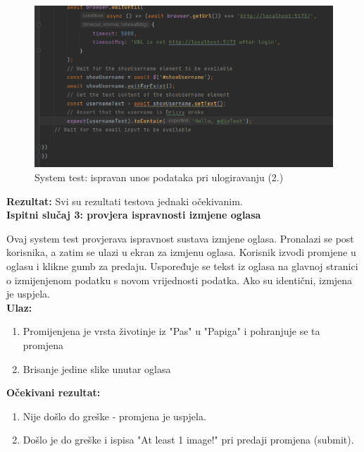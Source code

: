 			\begin{figure}[H]
				\includegraphics[scale=0.7]{slike/syslogin2.PNG} 
				\centering
				\caption{System test: ispravan unos podataka pri ulogiravanju (2.)}
				\label{syslogin2}
			\end{figure}
			
			\textbf{Rezultat:}
			Svi su rezultati testova jednaki očekivanim.\\
			
			\textbf{Ispitni slučaj 3: provjera ispravnosti izmjene oglasa}
			
			Ovaj system test provjerava ispravnost sustava izmjene oglasa. Pronalazi se post korisnika, a zatim se ulazi u ekran za izmjenu oglasa. Korisnik izvodi promjene u oglasu i klikne gumb za predaju. Uspoređuje se tekst iz oglasa na glavnoj stranici o izmijenjenom podatku s novom vrijednosti podatka. Ako su identični, izmjena je uspjela. \\
			
			\textbf{Ulaz:}
			
				\begin{enumerate}
					\item Promijenjena je vrsta životinje iz "Pas" u "Papiga" i pohranjuje se ta promjena
					\item Brisanje jedine slike unutar oglasa
				\end{enumerate}
				
			\textbf{Očekivani rezultat:}
			
				\begin{enumerate}
					\item Nije došlo do greške - promjena je uspjela.
					\item Došlo je do greške i ispisa "At least 1 image!" pri predaji promjena (submit).
				\end{enumerate}
			
